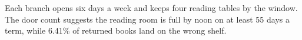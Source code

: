 Each branch opens six days a week and keeps four reading tables by the window.
The door count suggests the reading room is full by noon on at least 55 days a term, while 6.41\% of returned books land on the wrong shelf.
